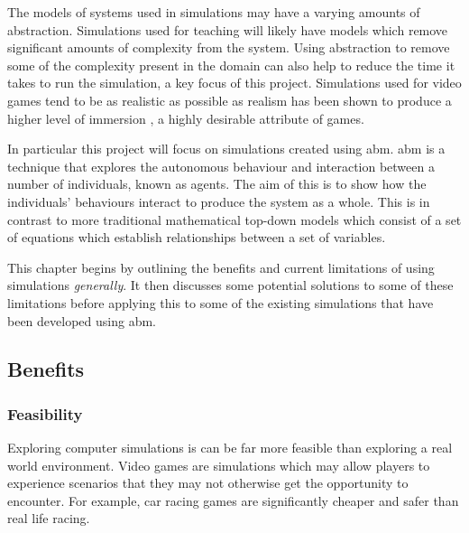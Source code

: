 \documentclass{UoYCSproject}
\begin{document}
The models of systems used in simulations may have a varying amounts of abstraction.
Simulations used for teaching will likely have models which remove significant amounts of complexity from the system.
Using abstraction to remove some of the complexity present in the domain can also help to reduce the time it takes to run the simulation, a key focus of this project.
Simulations used for video games tend to be as realistic as possible as realism has been shown to produce a higher level of immersion \cite{realism_immersion}, a highly desirable attribute of games.

In particular this project will focus on simulations created using \acrfull{abm}.
\gls{abm} is a technique that explores the autonomous behaviour and interaction between a number of individuals, known as agents.
The aim of this is to show how the individuals' behaviours interact to produce the system as a whole.
This is in contrast to more traditional mathematical top-down models which consist of a set of equations which establish relationships between a set of variables.


This chapter begins by outlining the benefits and current limitations of using simulations \textit{generally}.
It then discusses some potential solutions to some of these limitations before applying this to some of the existing simulations that have been developed using \gls{abm}.

\subsection{Benefits}
\subsubsection{Feasibility}
Exploring computer simulations is can be far more feasible than exploring a real world environment.
Video games are simulations which may allow players to experience scenarios that they may not otherwise get the opportunity to encounter.
For example, car racing games are significantly cheaper and safer than real life racing.
\end{document}
